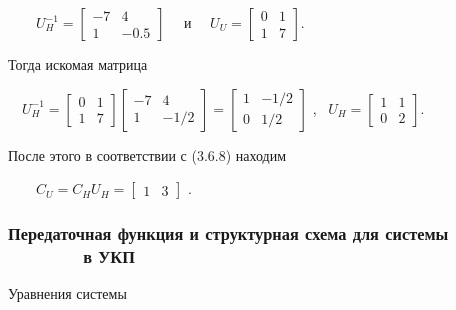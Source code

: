 \documentclass[a4paper]{article}
\begin{document}
{\begin{russian}\sffamily
\ \ \ \  $U_H^{-1}=\left[\begin{matrix}-7&4\\1&-0.5\end{matrix}\right]$ \ \ и \ \ 
$U_U=\left[\begin{matrix}0&1\\1&7\end{matrix}\right]$.
\end{russian}}

{\begin{russian}\sffamily
Тогда искомая матрица
\end{russian}}

{\begin{russian}\sffamily
\ \ 
$U_H^{-1}=\left[\begin{matrix}0&1\\1&7\end{matrix}\right]\left[\begin{matrix}-7&4\\1&-1/2\end{matrix}\right]=\left[\begin{matrix}1&-1/2\\0&1/2\end{matrix}\right]$
, \  $U_H=\left[\begin{matrix}1&1\\0&2\end{matrix}\right]$.
\end{russian}}

{\begin{russian}\sffamily
После этого в соответствии с (3.6.8) находим
\end{russian}}

{\begin{russian}\sffamily
\ \ \ \  $C_U=C_HU_H=\left[\begin{matrix}1&3\end{matrix}\right]$ .
\end{russian}}


\bigskip

\subsubsection[Передаточная функция и структурная схема для системы \ \ \ \ \ \ \ \ в УКП]{Передаточная функция и
структурная схема для системы \ \ \ \ \ \ \ \ в УКП}
\hypertarget{RefHeadingToc455659740}{}{\begin{russian}\sffamily
Уравнения системы 
\end{russian}}
\end{document}
